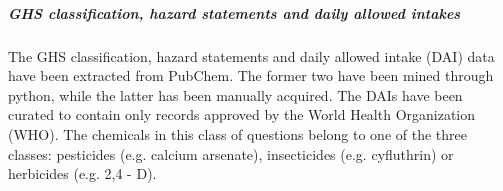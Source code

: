 \subparagraph{GHS classification, hazard statements and daily allowed intakes}

The GHS classification, hazard statements and daily allowed intake (DAI) data have been extracted from PubChem. 
The former two have been mined through python, while the latter has been manually acquired.
The DAIs have been curated to contain only records approved by the World Health Organization (WHO). 
The chemicals in this class of questions belong to one of the three classes: pesticides (e.g. calcium arsenate), insecticides (e.g. cyfluthrin) or herbicides (e.g. 2,4 - D). 
